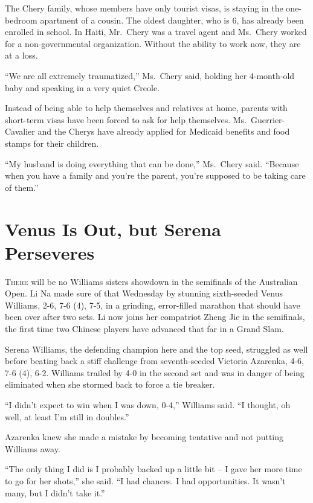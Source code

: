 ﻿\documentclass[12pt]{article}
\begin{document}
The Chery family, whose members have only tourist visas, is staying in the one-bedroom apartment of
a cousin. The oldest daughter, who is 6, has already been enrolled in school. In Haiti, Mr.~Chery
was a travel agent and Ms.~Chery worked for a non-governmental organization. Without the ability to
work now, they are at a loss.

``We are all extremely traumatized,'' Ms.~Chery said, holding her 4-month-old baby and speaking in a
very quiet Creole.

Instead of being able to help themselves and relatives at home, parents with short-term visas have
been forced to ask for help themselves. Ms.~Guerrier-Cavalier and the Cherys have already applied
for Medicaid benefits and food stamps for their children.

``My husband is doing everything that can be done,'' Ms.~Chery said. ``Because when you have a
family and you're the parent, you're supposed to be taking care of them.''

\section{Venus Is Out, but Serena Perseveres}

\lettrine{T}{here} will be no Williams sisters showdown in the semifinals of
the Australian Open. Li Na made sure of that Wednesday by stunning sixth-seeded Venus Williams, 2-6,
7-6 (4), 7-5, in a grinding, error-filled marathon that should have been over after two sets. Li now
joins her compatriot Zheng Jie in the semifinals, the first time two Chinese players have advanced
that far in a Grand Slam.


Serena Williams, the defending champion here and the top seed, struggled as well before beating back
a stiff challenge from seventh-seeded Victoria Azarenka, 4-6, 7-6 (4), 6-2. Williams trailed by 4-0
in the second set and was in danger of being eliminated when she stormed back to force a tie
breaker.

``I didn't expect to win when I was down, 0-4,'' Williams said. ``I thought, oh well, at least I'm
still in doubles.''

Azarenka knew she made a mistake by becoming tentative and not putting Williams away.

``The only thing I did is I probably backed up a little bit -- I gave her more time to go for her
shots,'' she said. ``I had chances. I had opportunities. It wasn't many, but I didn't take it.''
\end{document}

